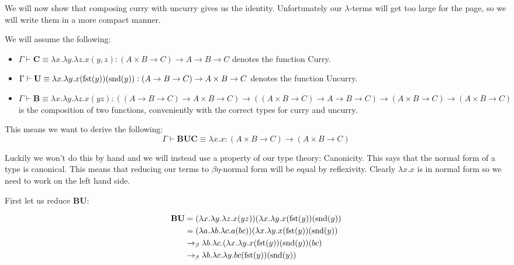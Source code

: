 We will now show that composing curry with uncurry gives us the identity. Unfortunately our $\lambda$-terms will get too large for the page, so we will write them in a more compact manner.

\begin{example}\label{curry_uncurry}
    We will assume the following:
    \begin{itemize}
    \item $\Gamma \vdash \mathbf{C} \equiv \lambda x . \lambda y . \lambda z . x (y, z) : (A \times B \to C) \to A \to B \to C$ denotes the function Curry.    
    \item $\Gamma \vdash \mathbf{U} \equiv \lambda x . \lambda y . x (\mathrm{fst}(y))(\mathrm{snd}(y)) : (A \to B \to C) \to A \times B \to C$ denotes the function Uncurry.
    \item $\Gamma \vdash \mathbf{B} \equiv \lambda x . \lambda y . \lambda z . x ( y z) : ((A \to B \to C) \to A \times B \to C) \to ((A \times B \to C) \to A \to B \to C) \to (A \times B \to C) \to (A \times B \to C)$ is the composition of two functions, conveniently with the correct types for curry and uncurry.
    \end{itemize}

    This means we want to derive the following:
    $$
        \Gamma \vdash \mathbf{B} \mathbf{U} \mathbf{C} \equiv \lambda x . x : (A \times B \to C) \to (A \times B \to C)
    $$
    
    Luckily we won't do this by hand and we will instead use a property of our type theory: Canonicity. This says that the normal form of a type is canonical. This means that reducing our terms to $\beta \eta$-normal form will be equal by reflexivity. Clearly $\lambda x . x$ is in normal form so we need to work on the left hand side.
    
    First let us reduce $\mathbf{B} \mathbf{U}$:
    
    \begin{equation*}
        \begin{aligned}
            \mathbf{B} \mathbf{U} &= (\lambda x . \lambda y . \lambda z . x (y z)) (\lambda x .\lambda y. x (\mathrm{fst}(y))(\mathrm{snd}(y)) \\
            &= (\lambda a . \lambda b . \lambda c . a (b c)) (\lambda x .\lambda y. x (\mathrm{fst}(y))(\mathrm{snd}(y)) \\
            &\to_{\beta} \lambda b . \lambda c . (\lambda x .\lambda y. x (\mathrm{fst}(y))(\mathrm{snd}(y)) (b c)  \\
            &\to_{\beta} \lambda b . \lambda c . \lambda y. b c(\mathrm{fst}(y))(\mathrm{snd}(y))  \\
        \end{aligned}
    \end{equation*}
    

\end{example}
